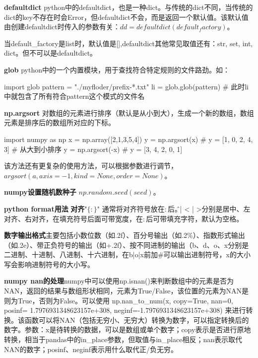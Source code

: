 \textbf{defaultdict} python中的defaultdict，也是一种dict。与传统的dict不同，当传统的dict的key不存在时会Error，但defaultdict不会，而是返回一个默认值。该默认值由创建defaultdict时传入的参数有关：$dd = defaultdict(default_factory)$。

当default\_factory是list时，默认值是[],defaultdict其他常见取值还有：str, set, int, dict。但不可以是defaultdict。

\textbf{glob} python中的一个内置模块，用于查找符合特定规则的文件路劲。如：
\begin{python}
	import glob
	pattern = "./myfloder/prefix-*.txt"
	li = glob.glob(pattern) # 此时li中就包含了所有符合pattern这个模式的文件名
\end{python}


\textbf{np.argsort} 对数组的元素进行排序（默认是从小到大），生成一个新的数组，数组元素是排序后的数组所对应的下标。
\begin{python}
	import numpy as np
	x = np.array([2,1,3,5,4])
	y = np.argsort(x) # y = [1, 0, 2, 4, 3]
	# 从大到小排序
	y = np.argsort(-x) # y = [3, 4, 2, 0, 1]
\end{python}
该方法还有更复杂的使用方法，可以根据参数进行调节，$argsort(a, axis=-1, kind=None, order=None)$。

\textbf{numpy设置随机数种子} $np.random.seed(seed)$。

\textbf{python format用法}
\textbf{对齐}"$\{:\}$" 通常将对齐符号放在$:$后。\^ 、| < | >分别是居中、左对齐、右对齐，在填充符号后面可带宽度，在$:$后可带填充字符，默认为空格。

\textbf{数字输出格式}主要包括小数位数（如.2f）、百分号输出（如.2\%）、指数形式输出（如.2e）、带正负符号的输出（如+.2f）、按不同进制的输出（b、d、o、x分别是二进制、十进制、八进制、十六进制，在b|o|x前加\#可以输出进制符号，x的大小写会影响进制符号的大小写。

\textbf{numpy nan的处理}numpy中可以使用np.isnan()来判断数组中的元素是否为NAN，返回的结果与数组形状相同，元素为True/False，该位置的元素为NAN是则为True，否则为False。可以使用 np.nan\_to\_num(x, copy=True, nan=0, posinf= 1.7976931348623157e+308, neginf=-1.7976931348623157e+308) 来进行转换。该函数可以将NAN（包括无穷小、无穷大）转换为数字，可以指定转换后的数字。参数：x是待转换的数据，可以是数组或单个数字；copy表示是否进行原地转换，相当于pandas中的in\_place参数，但取值与in\_place相反；nan表示取代NAN的数字；posinf、neginf表示用什么取代正/负无穷。

